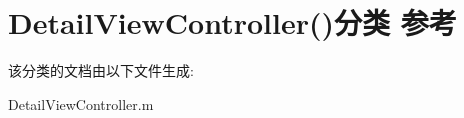 \hypertarget{category_detail_view_controller_07_08}{\section{Detail\-View\-Controller()分类 参考}
\label{category_detail_view_controller_07_08}
}


该分类的文档由以下文件生成\-:\begin{DoxyCompactItemize}
\item 
Detail\-View\-Controller.\-m\end{DoxyCompactItemize}

